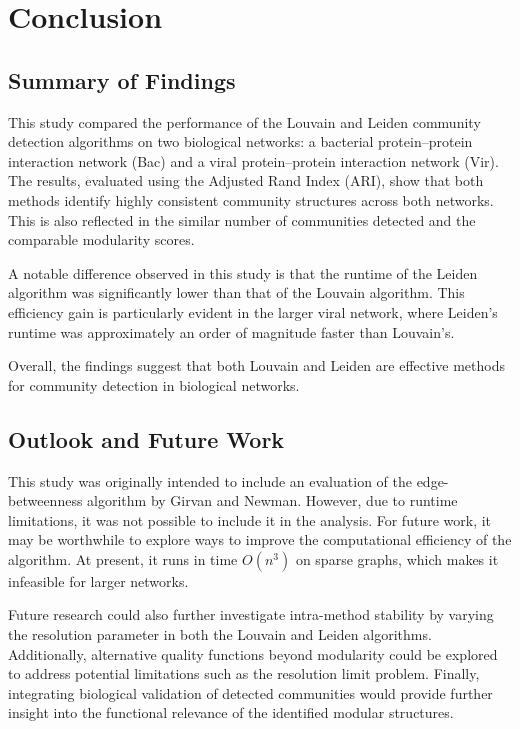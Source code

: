 \section{Conclusion}

\subsection{Summary of Findings}

This study compared the performance of the Louvain and Leiden community detection algorithms
on two biological networks: a bacterial protein–protein interaction network (Bac) 
and a viral protein–protein interaction network (Vir). 
The results, evaluated using the Adjusted Rand Index (ARI), show that both methods identify
highly consistent community structures across both networks. 
This is also reflected in the similar number of communities detected and the comparable modularity scores.

A notable difference observed in this study is that the runtime of
the Leiden algorithm was significantly lower than that of the Louvain algorithm.
This efficiency gain is particularly evident in the larger viral network, 
where Leiden's runtime was approximately an order of magnitude faster than Louvain's.

Overall, the findings suggest that both Louvain and Leiden are 
effective methods for community detection in biological networks.

\subsection{Outlook and Future Work}

This study was originally intended to include an evaluation of the edge-betweenness 
algorithm by Girvan and Newman. However, due to runtime limitations, it was not possible
to include it in the analysis. For future work, it may be worthwhile to explore
ways to improve the computational efficiency of the algorithm. At present, it runs in time 
$O(n^3)$ on sparse graphs, which makes it infeasible for larger networks.

Future research could also further investigate intra-method stability by varying the
resolution parameter in both the Louvain and Leiden algorithms.
Additionally, alternative quality functions beyond modularity could
be explored to address potential limitations such as the resolution limit problem.
Finally, integrating biological validation of detected communities would provide further 
insight into the functional relevance of the identified modular structures.
